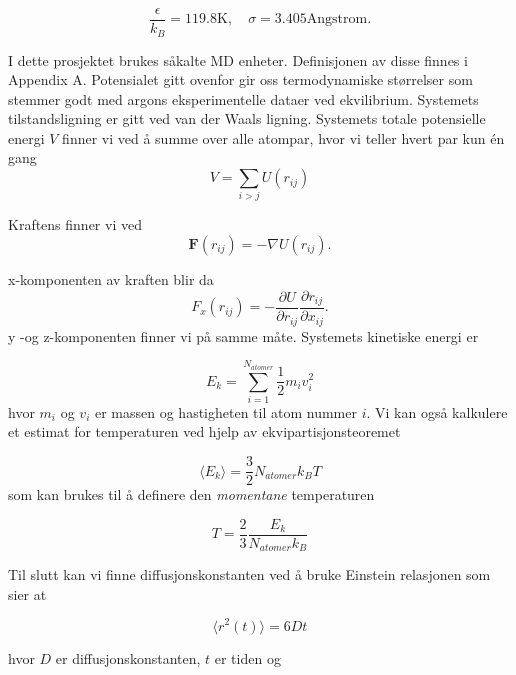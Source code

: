 \documentclass[paper=a4, fontsize=11pt]{scrartcl} %
\numberwithin{equation}{section} %
\numberwithin{figure}{section} %
\numberwithin{table}{section} %
\begin{document}
\begin{equation}
	\frac{\epsilon}{k_B} = 119.8\mathrm{K}, \quad \sigma=3.405 \mathrm{Angstrom}.
\end{equation}

I dette prosjektet brukes såkalte MD enheter. Definisjonen av disse finnes i Appendix A. Potensialet gitt ovenfor gir oss termodynamiske størrelser som stemmer godt med argons eksperimentelle dataer ved ekvilibrium. Systemets tilstandsligning er gitt ved van der Waals ligning. Systemets totale potensielle energi $V$ finner vi ved å summe over alle atompar, hvor vi teller hvert par kun én gang
\begin{equation}
V = \sum_{i>j} U(r_{ij})
\end{equation}

Kraftens  finner vi ved
\begin{equation}
\textbf{F}(r_{ij}) = - \nabla U(r_{ij}).
\end{equation}

x-komponenten av kraften blir da
\begin{equation}
F_x (r_{ij}) = -\frac{\partial U}{\partial r_{ij}} \frac{\partial r_{ij}}{\partial x_{ij}}.
\end{equation}
y -og z-komponenten finner vi på samme måte. Systemets kinetiske energi er 

\begin{equation}
E_k = \sum_{i=1}^{N_{atomer}} \frac{1}{2}m_iv_i^2
\end{equation}
hvor $m_i$ og $v_i$ er massen og hastigheten til atom nummer $i$. Vi kan også kalkulere et estimat for temperaturen ved hjelp av ekvipartisjonsteoremet 

\begin{equation}
\langle E_k \rangle = \frac{3}{2}N_{atomer} k_B T
\end{equation}
som kan brukes til å definere den \textit{momentane} temperaturen

\begin{equation}
T = \frac{2}{3}\frac{E_k}{N_{atomer} k_B}
\end{equation}

Til slutt kan vi finne diffusjonskonstanten ved å bruke Einstein relasjonen som sier at

\begin{equation}
\langle r^2(t) \rangle = 6 D t
\end{equation}

hvor $D$ er diffusjonskonstanten, $t$ er tiden og
\end{document}
